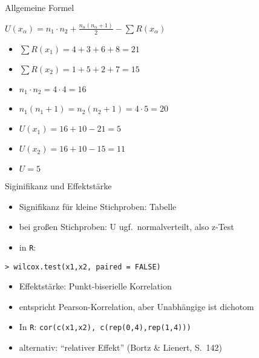 \begin{frame}
  {Allgemeine Formel}
  \begin{center}
    \alert{$U(x_{\alpha})=n_1\cdot n_2+\frac{n_{\alpha}(n_{\alpha}+1)}{2}-\sum R(x_{\alpha})$}
  \end{center}
  \pause
  \begin{itemize}[<+->]
    \item $\sum R(x_1)=4+3+6+8=21$
    \item $\sum R(x_2)=1+5+2+7=15$
    \item $n_1\cdot n_2=4\cdot 4=16$
    \item $n_1(n_1+1)=n_2(n_2+1)=4\cdot5=20$
    \item $U(x_1)=16+10-21=5$
    \item $U(x_2)=16+10-15=11$
    \item \alert{$U=5$}
  \end{itemize}
\end{frame}

\begin{frame}
  {Siginifikanz und Effektstärke}
  \begin{itemize}[<+->]
    \item Signifikanz für kleine Stichproben: \alert{Tabelle}
    \item bei großen Stichproben: U ugf.\ normalverteilt, also \alert{z-Test}
    \item in \texttt{R}:
  \end{itemize}
  \pause
  \begin{center}
    \alert{\texttt{> wilcox.test(x1,x2, paired = FALSE)}}
  \end{center}
  \pause
  \Zeile
  \begin{itemize}[<+->]
    \item Effektstärke: Punkt-biserielle Korrelation
    \item entspricht Pearson-Korrelation, aber Unabhängige ist dichotom
    \item In \texttt{R}: \alert{\texttt{cor(c(x1,x2), c(rep(0,4),rep(1,4)))}}
  \Zeile
    \item alternativ: "`relativer Effekt"' (Bortz \& Lienert, S.\ 142)
  \end{itemize}
\end{frame}

